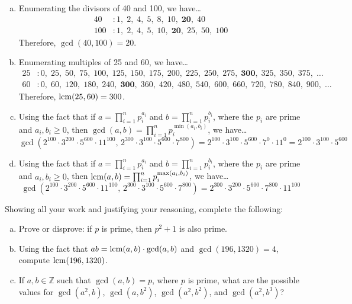 \documentclass[11pt,letterpaper]{article}
\begin{document}
\sol 
\begin{enumerate}[(a)]
\item Enumerating the divisors of 40 and 100, we have\dots
	\[
	\begin{aligned}
	40&\colon 1, \; 2, \; 4, \; 5, \; 8, \; 10, \; \mathbf{20}, \; 40 \\
	100&\colon 1, \; 2, \; 4, \; 5, \; 10, \; \mathbf{20}, \; 25, \; 50, \; 100
	\end{aligned}
	\]
Therefore, $\gcd(40, 100)= 20$. \pspace

\item Enumerating multiples of 25 and 60, we have\dots
	\[
	\begin{aligned}
	25&\colon 0, \; 25, \; 50, \; 75, \; 100, \; 125, \; 150, \; 175, \; 200, \; 225, \; 250, \; 275, \; \mathbf{300}, \; 325, \; 350, \; 375, \; \ldots \\
	60&\colon 0, \; 60, \; 120, \; 180, \; 240, \; \mathbf{300}, \; 360, \; 420, \; 480, \; 540, \; 600, \; 660, \; 720, \; 780, \; 840, \; 900, \; \ldots
	\end{aligned}
	\]
Therefore, $\operatorname{lcm}(25, 60)= 300$. \pspace

\item Using the fact that if $a= \prod_{i=1}^n p_i^{a_i}$ and $b= \prod_{i=1}^n p_i^{b_i}$, where the $p_i$ are prime and $a_i, b_i \geq 0$, then $\gcd(a, b)= \prod_{i=1}^n p_i^{\min(a_i, b_i)}$, we have\dots
	\[
	\gcd(2^{100} \cdot 3^{200} \cdot 5^{600} \cdot 11^{100},\, 2^{300} \cdot 3^{100} \cdot 5^{600} \cdot 7^{800})= 2^{100} \cdot 3^{100} \cdot 5^{600} \cdot 7^0 \cdot 11^0= 2^{100} \cdot 3^{100} \cdot 5^{600}
	\] \pspace

\item Using the fact that if $a= \prod_{i=1}^n p_i^{a_i}$ and $b= \prod_{i=1}^n p_i^{b_i}$, where the $p_i$ are prime and $a_i, b_i \geq 0$, then $\operatorname{lcm}(a, b)= \prod_{i=1}^n p_i^{\max(a_i, b_i)}$, we have\dots
	\[
	\gcd(2^{100} \cdot 3^{200} \cdot 5^{600} \cdot 11^{100},\, 2^{300} \cdot 3^{100} \cdot 5^{600} \cdot 7^{800})= 2^{300} \cdot 3^{200} \cdot 5^{600} \cdot 7^{800} \cdot 11^{100} 
	\] 
\end{enumerate}



\newpage



 Showing all your work and justifying your reasoning, complete the following:
	\begin{enumerate}[(a)]
	\item Prove or disprove: if $p$ is prime, then $p^2 + 1$ is also prime. 
	\item Using the fact that $ab= \operatorname{lcm}(a, b) \cdot \gcd(a, b)$ and $\gcd(196, 1320)= 4$, compute $\operatorname{lcm}(196, 1320)$. 
	\item If $a, b \in \mathbb{Z}$ such that $\gcd(a, b)= p$, where $p$ is prime, what are the possible values for $\gcd(a^2, b)$, $\gcd(a, b^2)$, $\gcd(a^2, b^2)$, and $\gcd(a^2, b^3)$? 
	\end{enumerate} \pspace
\end{document}

